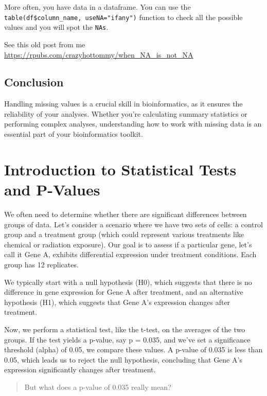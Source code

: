 \documentclass[
]{book}
\begin{document}
More often, you have data in a dataframe. You can use the \texttt{table(df\$column\_name,\ useNA="ifany")} function to check all the possible values and you will spot the \texttt{NAs}.

See this old post from me \url{https://rpubs.com/crazyhottommy/when_NA_is_not_NA}

\hypertarget{conclusion-9}{%
\subsection{Conclusion}\label{conclusion-9}}

Handling missing values is a crucial skill in bioinformatics, as it ensures the reliability of your analyses. Whether you're calculating summary statistics or performing complex analyses, understanding how to work with missing data is an essential part of your bioinformatics toolkit.

\hypertarget{introduction-to-statistical-tests-and-p-values}{%
\section{Introduction to Statistical Tests and P-Values}\label{introduction-to-statistical-tests-and-p-values}}

We often need to determine whether there are significant differences between groups of data. Let's consider a scenario where we have two sets of cells: a control group and a treatment group (which could represent various treatments like chemical or radiation exposure). Our goal is to assess if a particular gene, let's call it Gene A, exhibits differential expression under treatment conditions. Each group has 12 replicates.

We typically start with a null hypothesis (H0), which suggests that there is no difference in gene expression for Gene A after treatment, and an alternative hypothesis (H1), which suggests that Gene A's expression changes after treatment.

Now, we perform a statistical test, like the t-test, on the averages of the two groups. If the test yields a p-value, say p = 0.035, and we've set a significance threshold (alpha) of 0.05, we compare these values. A p-value of 0.035 is less than 0.05, which leads us to reject the null hypothesis, concluding that Gene A's expression significantly changes after treatment.

\begin{quote}
But what does a p-value of 0.035 really mean?
\end{quote}
\end{document}
